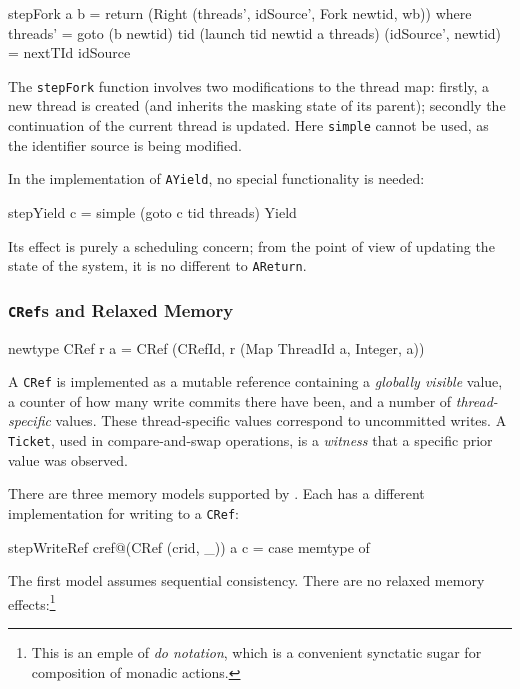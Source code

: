 \begin{haskellcode}
stepFork a b = return (Right (threads', idSource', Fork newtid, wb)) where
  threads' = goto (b newtid) tid (launch tid newtid a threads)
  (idSource', newtid) = nextTId idSource
\end{haskellcode}

The \verb|stepFork| function involves two modifications to the thread
map: firstly, a new thread is created (and inherits the masking state
of its parent); secondly the continuation of the current thread is
updated. Here \verb|simple| cannot be used, as the identifier source
is being modified.

In the implementation of \verb|AYield|, no special functionality is
needed:

\begin{haskellcode}
stepYield c = simple (goto c tid threads) Yield
\end{haskellcode}

Its effect is purely a scheduling concern; from the point of view of
updating the state of the system, it is no different to
\verb|AReturn|.

\subsubsection{\texttt{CRef}s and Relaxed Memory}
\label{sec:execution-stepwise-cref}

\begin{haskellcode}
newtype CRef r a = CRef (CRefId, r (Map ThreadId a, Integer, a))
\end{haskellcode}

A \verb|CRef| is implemented as a mutable reference containing a
\emph{globally visible} value, a counter of how many write commits
there have been, and a number of \emph{thread-specific} values. These
thread-specific values correspond to uncommitted writes. A
\verb|Ticket|, used in compare-and-swap operations, is a
\emph{witness} that a specific prior value was observed.

There are three memory models supported by \dejafu{}. Each has a
different implementation for writing to a \verb|CRef|:

\begin{haskellcode}
stepWriteRef cref@(CRef (crid, _)) a c = case memtype of
\end{haskellcode}

The first model assumes sequential consistency. There are no relaxed
memory effects:\footnote{This is an emple of \emph{do notation}, which
  is a convenient synctatic sugar for composition of monadic actions.}

